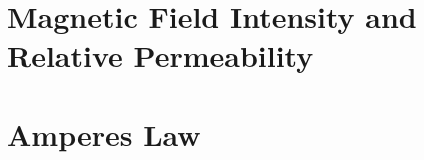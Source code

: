 \documentclass[10pt]{article}
\begin{document}
\section{Magnetic Field Intensity and Relative Permeability}





\section{Amperes Law}
\end{document}
